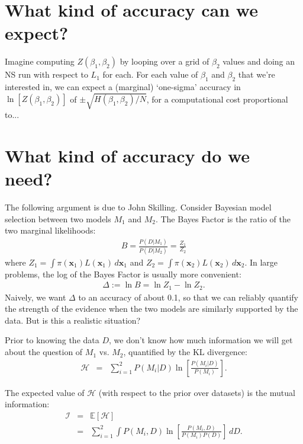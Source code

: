 \documentclass[journal,article,accept,moreauthors,pdftex,12pt,a4paper]{mdpi}
\newcommand{\xx}{\boldsymbol{x}}
\begin{document}
\section{What kind of accuracy can we expect?}

Imagine computing $Z(\beta_1, \beta_2)$ by looping over a grid of $\beta_2$
values and doing an NS run with respect to $L_1$ for each. For each
value of $\beta_1$ and $\beta_2$ that we're interested in, we can expect
a (marginal) `one-sigma' accuracy in
$\ln\left[Z(\beta_1, \beta_2)\right]$ of $\pm \sqrt{H(\beta_1, \beta_2)/N}$,
for a computational cost proportional to...

\section{What kind of accuracy do we need?}

The following argument is due to John Skilling. Consider Bayesian model selection
between two models $M_1$ and $M_2$. The Bayes Factor is the ratio of the
two marginal likelihoods:
\begin{eqnarray}
B = \frac{P(D | M_1)}{P(D | M_2)} = \frac{Z_1}{Z_2}
\end{eqnarray}
where $Z_1 = \int \pi(\xx_1)L(\xx_1) \, d\xx_1$ and
$Z_2 = \int \pi(\xx_2)L(\xx_2) \, d\xx_2$.
In large problems, the log of the Bayes Factor is usually more convenient:
\begin{eqnarray}
\Delta := \ln B = \ln Z_1 - \ln Z_2.
\end{eqnarray}
Naively, we want $\Delta$ to an accuracy of about 0.1, so that we can reliably
quantify the strength of the evidence when the two models are similarly
supported by the data. But is this a realistic situation?

Prior to knowing the data $D$, we don't know how much information we will get
about the question of $M_1$ vs. $M_2$, quantified by the KL divergence:
\begin{eqnarray}
\mathcal{H} &=& \sum_{i=1}^2 P(M_i | D)
\ln\left[
\frac{P(M_i | D)}{P(M_i)}
\right].
\end{eqnarray}

The expected value of $\mathcal{H}$ (with respect to the prior over datasets)
is the mutual information:
\begin{eqnarray}
\mathcal{I} &=& \mathds{E}\left[\mathcal{H}\right]\\
&=&
\sum_{i=1}^2 \int P(M_i, D)
\ln\left[
\frac{P(M_i, D)}{P(M_i)P(D)}
\right] \, dD.
\end{eqnarray}
\end{document}
